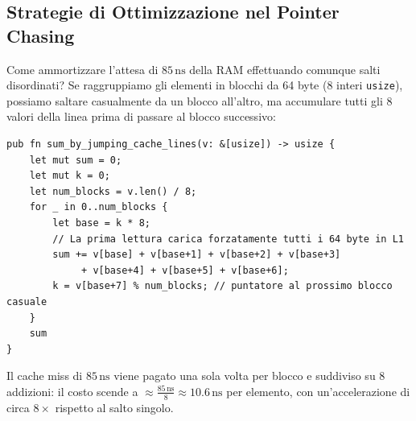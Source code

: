 \begin{table}[H]
\centering
\small
{}
\caption{Benchmark comparativo del tempo per elemento al variare della taglia del vettore~\cite{bakhvalov2024}.}
\label{tab:sum-vs-jumping}
\end{table}

\FloatBarrier
\subsection{Strategie di Ottimizzazione nel Pointer Chasing}
\label{subsec:sfide-didattiche-pointer-chasing}

\begin{example}
Come ammortizzare l'attesa di $85\,\text{ns}$ della RAM effettuando comunque salti disordinati?
Se raggruppiamo gli elementi in blocchi da 64 byte (8 interi \texttt{usize}), possiamo saltare casualmente da un blocco all'altro, ma accumulare tutti gli 8 valori della linea prima di passare al blocco successivo:
\begin{lstlisting}[style=rustcode]
pub fn sum_by_jumping_cache_lines(v: &[usize]) -> usize {
    let mut sum = 0;
    let mut k = 0;
    let num_blocks = v.len() / 8;
    for _ in 0..num_blocks {
        let base = k * 8;
        // La prima lettura carica forzatamente tutti i 64 byte in L1
        sum += v[base] + v[base+1] + v[base+2] + v[base+3]
             + v[base+4] + v[base+5] + v[base+6];
        k = v[base+7] % num_blocks; // puntatore al prossimo blocco casuale
    }
    sum
}
\end{lstlisting}
Il cache miss di $85\,\text{ns}$ viene pagato una sola volta per blocco e suddiviso su 8 addizioni: il costo scende a $\approx \frac{85\,\text{ns}}{8} \approx 10.6\,\text{ns}$ per elemento, con un'accelerazione di circa $8\times$ rispetto al salto singolo.
\end{example}

